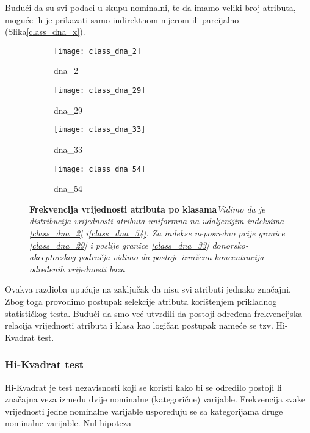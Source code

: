 Budući da su svi podaci u skupu nominalni, te da imamo veliki broj atributa, moguće ih je prikazati samo indirektnom mjerom ili parcijalno (Slika\ref{class_dna_x}).
\begin{center}
   \begin{figure}[ht!]
   \begin{subfigure}{.5\textwidth}
         \texttt{[image: class\_dna\_2]}
         \caption{dna{\_}2}
         \label{fig:class_dna_2}
   \end{subfigure}
   \begin{subfigure}{.5\textwidth}
         \texttt{[image: class\_dna\_29]}
         \caption{dna{\_}29}
         \label{fig:class_dna_29}
   \end{subfigure}
   \begin{subfigure}{.5\textwidth}
         \texttt{[image: class\_dna\_33]}
         \caption{dna{\_}33}
         \label{fig:class_dna_33}
   \end{subfigure}
   \begin{subfigure}{.5\textwidth}
         \texttt{[image: class\_dna\_54]}
         \caption{dna{\_}54}
         \label{fig:class_dna_54}
   \end{subfigure}
   \caption[Dijagram rasipanja vrijednosti atributa po klasama]
   {\textbf{Frekvencija vrijednosti atributa po klasama}\textit{Vidimo da je distribucija vrijednosti atributa uniformna na udaljenijim indeksima \ref{class_dna_2} i\ref{class_dna_54}. Za indekse neposredno prije granice \ref{class_dna_29} i poslije granice \ref{class_dna_33} donorsko-akceptorskog područja vidimo da postoje izražena koncentracija određenih vrijednosti baza}}
    \label{fig:class_dna_x}
   \end{figure}
\end{center}
Ovakva razdioba upućuje na zaključak da nisu svi atributi jednako značajni. Zbog toga provodimo postupak selekcije atributa korištenjem prikladnog statističkog testa. Budući da smo već utvrdili da postoji određena frekvencijska relacija vrijednosti atributa i klasa kao logičan postupak nameće se tzv. Hi-Kvadrat test.
\subsubsection{Hi-Kvadrat test}
Hi-Kvadrat je test nezavisnosti koji se koristi kako bi se odredilo postoji li značajna veza između dvije nominalne (kategorične) varijable. Frekvencija svake vrijednosti jedne nominalne varijable uspoređuju se sa kategorijama druge nominalne varijable. Nul-hipoteza 
